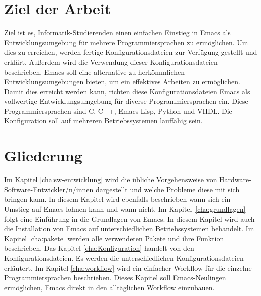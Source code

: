 \section{Ziel der Arbeit}
Ziel ist es, Informatik-Studierenden einen einfachen Einstieg in Emacs
als Entwicklungsumgebung für mehrere Programmiersprachen zu
ermöglichen. Um dies zu erreichen, werden fertige
Konfigurationsdateien zur Verfügung gestellt und erklärt. Außerdem
wird die Verwendung dieser Konfigurationsdateien beschrieben. Emacs
soll eine alternative zu herkömmlichen Entwicklungsumgebungen bieten,
um ein effektives Arbeiten zu ermöglichen. Damit dies erreicht werden
kann, richten diese Konfigurationsdateien Emacs als vollwertige
Entwicklungsumgebung für diverse Programmiersprachen ein. Diese
Programmiersprachen sind C, C++, Emacs Lisp, Python und VHDL. Die
Konfiguration soll auf mehreren Betriebssystemen lauffähig sein.\\

\section{Gliederung}
Im Kapitel \ref{cha:sw-entwicklung} wird die übliche Vorgehensweise
von Hardware-Software-Entwickler/n/innen dargestellt und welche
Probleme diese mit sich bringen kann. In diesem Kapitel wird ebenfalls
beschrieben wann sich ein Umstieg auf Emacs lohnen kann und wann
nicht. Im Kapitel~\ref{cha:grundlagen} folgt eine Einführung in die
Grundlagen von Emacs. In diesem Kapitel wird auch die Installation von
Emacs auf unterschiedlichen Betriebssystemen behandelt. Im Kapitel
\ref{cha:pakete} werden alle verwendeten Pakete und ihre Funktion
beschrieben. Das Kapitel \ref{cha:Konfiguration} handelt von den
Konfigurationsdateien. Es werden die unterschiedlichen
Konfigurationsdateien erläutert. Im Kapitel \ref{cha:workflow} wird
ein einfacher Workflow für die einzelne Programmiersprachen
beschrieben. Dieses Kapitel soll Emacs-Neulingen ermöglichen, Emacs
direkt in den alltäglichen Workflow einzubauen.\\
